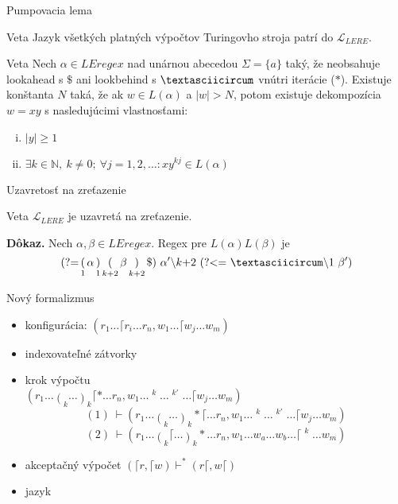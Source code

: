 \documentclass[mathserif]{beamer}
\def\N{\mathds{N}} %
\def\le{LEregex}
\def\lel{\mathscr{L}_{LERE}}
\def\lookahead{\text{(?=}}
\def\lookbehind{\text{(?\textless =}}
\begin{document}
\begin{frame}{Pumpovacia lema}
\begin{block}{Veta}
Jazyk všetkých platných výpočtov Turingovho stroja patrí do $\lel$.
\end{block}

\begin{block}{Veta}
Nech $\alpha\in\le$ nad unárnou abecedou $\Sigma = \lbrace a \rbrace$ taký, že neobsahuje lookahead s $\mathdollar$ ani lookbehind s $\textasciicircum$ vnútri iterácie ($*$). Existuje konštanta $N$ taká, že ak $w \in L(\alpha)$ a $\vert w \vert > N$, potom existuje dekompozícia $w=xy$ s nasledujúcimi vlastnosťami:
\begin{enumerate}[(i)]
\item $\vert y \vert \geq 1$
\item $\exists k \in \N,~k\neq 0;~\forall j = 1,2,\ldots: xy^{kj} \in L(\alpha)$
\end{enumerate}
\end{block}
\end{frame}

\begin{frame}{Uzavretosť na zreťazenie}
\begin{block}{Veta}
$\lel$ je uzavretá na zreťazenie.
\end{block}
\textbf{Dôkaz.} Nech $\alpha,\beta\in\le$. Regex pre $L(\alpha)L(\beta)$ je
$$
 \lookahead \mathop(_1 \alpha \mathop)_1 \mathop(_{k+2}\beta \mathop)_{k+2} \mathdollar) ~\alpha ' \backslash k\text{+2}~ \lookbehind ~\textasciicircum\backslash 1~\beta ')
$$
\end{frame}

\begin{frame}{Nový formalizmus}
\begin{itemize}
\item konfigurácia: $(r_1\dots \lceil r_i\dots r_n,w_1 \dots \lceil w_j \dots w_m)$
\item indexovateľné zátvorky
\item krok výpočtu 
\\ \vspace{5pt} $\displaystyle{(r_1 \dots \mathop{(}_k \dots \mathop{)}_k\lceil * \dots r_n, w_1 \dots \mathop{w_a}^k \dots \mathop{w_b}^{k'} \dots \lceil w_j \dots w_m)}$
$$(1) ~\vdash(r_1 \dots \mathop{(}_k \dots \mathop{)}_k *\lceil \dots r_n, w_1 \dots \mathop{w_a}^k \dots \mathop{w_b}^{k'} \dots \lceil w_j \dots w_m)$$
$$(2) ~\vdash(r_1 \dots \mathop{(}_k\lceil \dots \mathop{)}_k * \dots r_n, w_1 \dots w_a \dots w_b \dots \lceil \mathop{w_j}^k \dots w_m)$$
\item akceptačný výpočet $(\lceil r, \lceil w)\vdash^* (r \lceil, w \lceil)$
\item jazyk
\end{itemize}
\end{frame}
\end{document}
